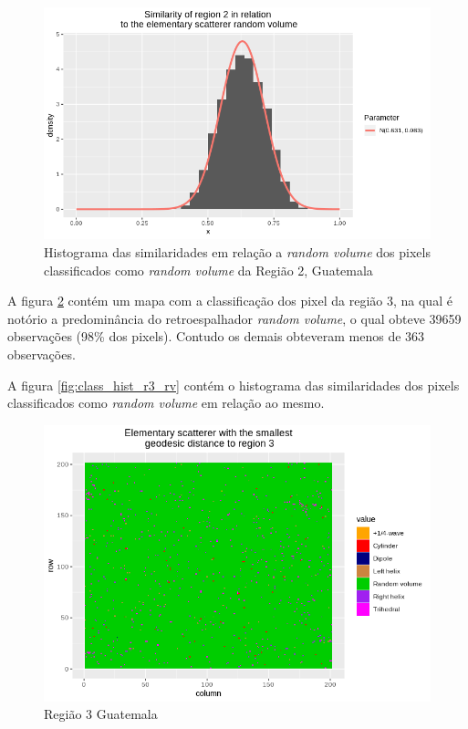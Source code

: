 \documentclass[12pt]{article}
\begin{document}
\begin{figure}[!h]
    \centering   
    \includegraphics[width = 0.9\linewidth]{../../Images/Report_18_12_20/Classifier_Geo_Dist/Histograms/Guate/region2_rv_sm_filter.png}
    \caption{Histograma das similaridades em relação a \textit{random volume} dos pixels classificados como \textit{random volume} da Região 2, Guatemala}
    \label{fig:class_hist_r2_rv}
\end{figure}

A figura \ref{fig:class_map_r3} contém um mapa com a classificação dos pixel da região 3, na qual é notório a predominância do retroespalhador \textit{random volume}, o qual obteve 39659 observações (98\% dos pixels). Contudo os demais obteveram menos de 363 observações. 

A figura \ref{fig:class_hist_r3_rv} contém o histograma das similaridades dos pixels classificados como \textit{random volume} em relação ao mesmo.

\begin{figure}[!h]
    \centering    
    \includegraphics[width = \linewidth]{../../Images/Report_18_12_20/Classifier_Geo_Dist/Class_Map/Guate/region3_predomain.png}
    \caption{Região 3 Guatemala}
    \label{fig:class_map_r3}
\end{figure}
\end{document}
